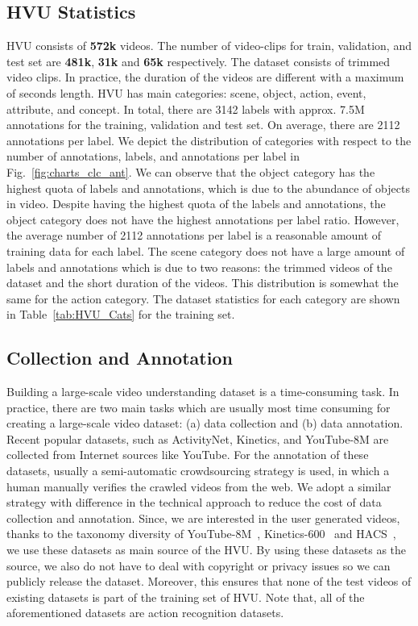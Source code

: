 \documentclass[runningheads]{llncs}
\begin{document}
\subsection{HVU Statistics}
HVU consists of \textbf{572k} videos. The number of video-clips for train, validation, and test set are \textbf{481k}, \textbf{31k} and \textbf{65k} respectively.
The dataset consists of trimmed video clips. 
In practice, the duration of the videos are different with a maximum of  seconds length. HVU has  main categories: scene, object, action, event, attribute, and concept. In total, there are {3142} labels with approx. 7.5M annotations for the training, validation and test set. On average, there are 2112 annotations per label. We depict the distribution of categories with respect to the number of annotations, labels, and annotations per label in Fig.~\ref{fig:charts_clc_ant}. We can observe that the object category has the highest quota of labels and annotations, which is due to the abundance of objects in video. Despite having the highest quota of the labels and annotations, the object category does not have the highest annotations per label ratio. However, the average number of 2112 annotations per label is a reasonable amount of training data for each label. The scene category does not have a large amount of labels and annotations which is due to two reasons: the trimmed videos of the dataset and the short duration of the videos. This distribution is somewhat the same for the action category. The dataset statistics for each category are shown in Table~\ref{tab:HVU_Cats} for the training set.



\subsection{Collection and Annotation}
\label{subsec:collection_and_annotation}
Building a large-scale video understanding dataset is a time-consuming task. In practice, there are two main tasks which are usually most time consuming for creating a large-scale video dataset: (a) data collection and (b) data annotation.
Recent popular datasets, such as ActivityNet, Kinetics, and YouTube-8M are collected from Internet sources like YouTube.
For the annotation of these datasets, usually a semi-automatic crowdsourcing strategy is used, in which a human manually verifies the crawled videos from the web. We adopt a similar strategy with difference in the technical approach
to reduce the cost of data collection and annotation. Since, we are 
interested in the user generated videos, thanks to the taxonomy diversity of YouTube-8M~\cite{youtube8m}, Kinetics-600~\cite{kinetics} and HACS~\cite{hacs}, we use these datasets as main source of the HVU. By using these datasets as the source, we also do not have to deal with copyright or privacy issues so we can publicly release the dataset. Moreover, this ensures that none of the test videos of existing datasets is part of the training set of HVU. Note that, all of the aforementioned datasets are action recognition datasets.
\end{document}
